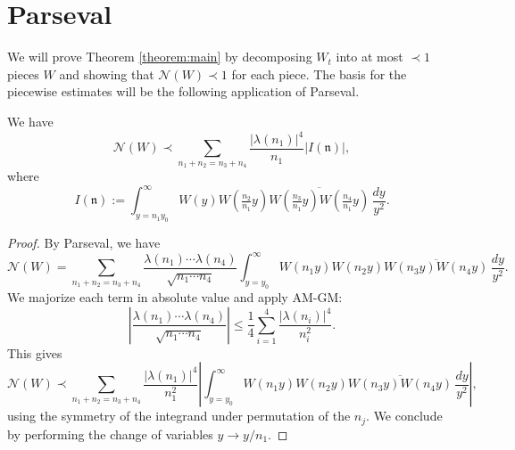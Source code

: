 \documentclass[reqno]{amsart} 
\begin{document}
\section{Parseval}\label{sec:cqx50az21s}
We will prove Theorem \ref{theorem:main} by decomposing $W_t$ into at most $\prec 1$ pieces $W$ and showing that $\mathcal{N}(W) \prec 1$ for each piece.  The basis for the piecewise estimates will be the following application of Parseval.
\begin{lemma}\label{lemma:unfolding}
  We have
  \begin{equation*}
    \mathcal{N}(W) \prec
    \sum _{n_1 + n_2 = n_3 + n_4}
    \frac{\left\lvert \lambda(n_1) \right\rvert^4}{n_1} \left\lvert I(\mathfrak{n}) \right\rvert,
  \end{equation*}
  where
  \begin{equation}\label{equation:definition-of-I-of-n}
    I(\mathfrak{n}) :=
    \int _{y = n_1 y _0 } ^\infty W (y ) W (\tfrac{n_2}{n _1} y) \overline{W (\tfrac{n _3 }{ n _1 } y) W (\tfrac{n _4}{n_1} y)} \, \frac{d y}{y^2}.
  \end{equation}
\end{lemma}
\begin{proof}
  By Parseval, we have
  \begin{equation*}
    \mathcal{N}(W) = \sum _{n _1 + n _2 = n _3 + n _4 }
    \frac{\lambda (n _1) \dotsb \lambda (n _4 )}{\sqrt{n _1 \dotsb n _4 }}
    \int _{y = y _0 } ^\infty
    W (n _1 y)
    W (n _2 y)
    \overline{W (n _3 y)
      W (n _4 y)}
    \, \frac{d y}{ y ^2 }.
  \end{equation*}
  We majorize each term in absolute value and apply AM-GM:
  \begin{equation*}
    \left|     \frac{\lambda (n _1) \dotsb \lambda (n _4 )}{\sqrt{n _1 \dotsb n _4 }} \right|
    \leq \frac{1}{4} \sum_{i = 1}^4 \frac{\left| \lambda(n_i) \right|^4}{n_i^2}.
  \end{equation*}
  This gives
  \begin{equation*}
    \mathcal{N}(W) \prec
    \sum _{n_1 + n_2 = n_3 + n_4}
    \frac{\left\lvert \lambda(n_1) \right\rvert^4}{n_1^2}
    \left\lvert
      \int _{y = y _0 } ^\infty W (n _1 y ) W (n _2 y) \overline{W (n _3 y) W (n _4 y)} \, \frac{d y}{y^2}
    \right\rvert,
  \end{equation*}
  using the symmetry of the integrand under permutation of the $n_j$.  We conclude by performing the change of variables $y \rightarrow y / n_1$.
\end{proof}
\end{document}
